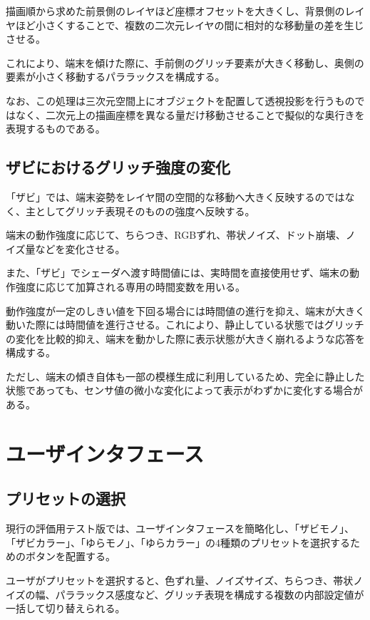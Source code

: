 描画順から求めた前景側のレイヤほど座標オフセットを大きくし、背景側のレイヤほど小さくすることで、複数の二次元レイヤの間に相対的な移動量の差を生じさせる。

これにより、端末を傾けた際に、手前側のグリッチ要素が大きく移動し、奥側の要素が小さく移動するパララックスを構成する。

なお、この処理は三次元空間上にオブジェクトを配置して透視投影を行うものではなく、二次元上の描画座標を異なる量だけ移動させることで擬似的な奥行きを表現するものである。


\subsection{ザビにおけるグリッチ強度の変化}

「ザビ」では、端末姿勢をレイヤ間の空間的な移動へ大きく反映するのではなく、主としてグリッチ表現そのものの強度へ反映する。

端末の動作強度に応じて、ちらつき、RGBずれ、帯状ノイズ、ドット崩壊、ノイズ量などを変化させる。

また、「ザビ」でシェーダへ渡す時間値には、実時間を直接使用せず、端末の動作強度に応じて加算される専用の時間変数を用いる。

動作強度が一定のしきい値を下回る場合には時間値の進行を抑え、端末が大きく動いた際には時間値を進行させる。これにより、静止している状態ではグリッチの変化を比較的抑え、端末を動かした際に表示状態が大きく崩れるような応答を構成する。

ただし、端末の傾き自体も一部の模様生成に利用しているため、完全に静止した状態であっても、センサ値の微小な変化によって表示がわずかに変化する場合がある。


\section{ユーザインタフェース}

\subsection{プリセットの選択}

現行の評価用テスト版では、ユーザインタフェースを簡略化し、「ザビモノ」、「ザビカラー」、「ゆらモノ」、「ゆらカラー」の4種類のプリセットを選択するためのボタンを配置する。

ユーザがプリセットを選択すると、色ずれ量、ノイズサイズ、ちらつき、帯状ノイズの幅、パララックス感度など、グリッチ表現を構成する複数の内部設定値が一括して切り替えられる。

